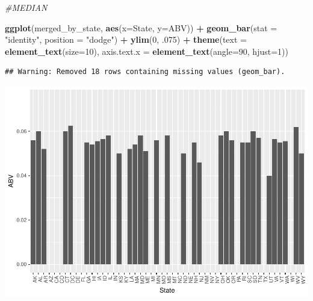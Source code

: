 \documentclass[]{article}
\newenvironment{Shaded}{\begin{snugshade}}{\end{snugshade}}
\newcommand{\KeywordTok}[1]{\textcolor[rgb]{0.13,0.29,0.53}{\textbf{#1}}}
\newcommand{\DataTypeTok}[1]{\textcolor[rgb]{0.13,0.29,0.53}{#1}}
\newcommand{\DecValTok}[1]{\textcolor[rgb]{0.00,0.00,0.81}{#1}}
\newcommand{\StringTok}[1]{\textcolor[rgb]{0.31,0.60,0.02}{#1}}
\newcommand{\CommentTok}[1]{\textcolor[rgb]{0.56,0.35,0.01}{\textit{#1}}}
\newcommand{\OperatorTok}[1]{\textcolor[rgb]{0.81,0.36,0.00}{\textbf{#1}}}
\newcommand{\NormalTok}[1]{#1}
\begin{document}
\begin{Shaded}
\begin{Highlighting}[]
\CommentTok{#MEDIAN}

\KeywordTok{ggplot}\NormalTok{(merged_by_state, }\KeywordTok{aes}\NormalTok{(}\DataTypeTok{x=}\NormalTok{State, }\DataTypeTok{y=}\NormalTok{ABV)) }\OperatorTok{+}
\StringTok{  }\KeywordTok{geom_bar}\NormalTok{(}\DataTypeTok{stat =} \StringTok{"identity"}\NormalTok{, }\DataTypeTok{position =} \StringTok{"dodge"}\NormalTok{) }\OperatorTok{+}
\StringTok{  }\KeywordTok{ylim}\NormalTok{(}\DecValTok{0}\NormalTok{, .}\DecValTok{075}\NormalTok{) }\OperatorTok{+}
\StringTok{  }\KeywordTok{theme}\NormalTok{(}\DataTypeTok{text =} \KeywordTok{element_text}\NormalTok{(}\DataTypeTok{size=}\DecValTok{10}\NormalTok{),}
        \DataTypeTok{axis.text.x =} \KeywordTok{element_text}\NormalTok{(}\DataTypeTok{angle=}\DecValTok{90}\NormalTok{, }\DataTypeTok{hjust=}\DecValTok{1}\NormalTok{)) }
\end{Highlighting}
\end{Shaded}

\begin{verbatim}
## Warning: Removed 18 rows containing missing values (geom_bar).
\end{verbatim}

\includegraphics{Analysis_Final_files/figure-latex/unnamed-chunk-11-1.pdf}
\end{document}
